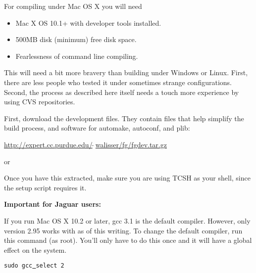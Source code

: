 For compiling under Mac OS X you will need

\begin{itemize}
\item Mac X OS 10.1+ with developer tools installed.
\item 500MB disk (minimum) free disk space.
\item Fearlessness of command line compiling.
\end{itemize}

This will need a bit more bravery than building under Windows or Linux. First, there are less people who tested it under sometimes strange configurations. Second, the process as described here itself needs a touch more experience by using CVS repositories.

First, download the development files. They contain files that help simplify
the build process, and software for automake, autoconf, and plib:
\medskip

     \href{http://expert.cc.purdue.edu/~walisser/fg/fgdev.tar.gz}{http://expert.cc.purdue.edu/$\tilde{~~}$walisser/fg/fgdev.tar.gz}
\medskip

\noindent
or
\medskip

\medskip

\noindent
Once you have this extracted, make sure you are using TCSH as your shell,
since the setup script requires it. 

\noindent
\textbf{Important for Jaguar users:}

If you run Mac OS X 10.2 or later, gcc 3.1 is the default compiler. However, only version 2.95 works with \FlightGear{} as of this writing. To change the default compiler, run this command (as root). You'll only have to do this once and it will have a global effect on the system. 
\medskip

\texttt{sudo gcc\underline{~}select 2}

